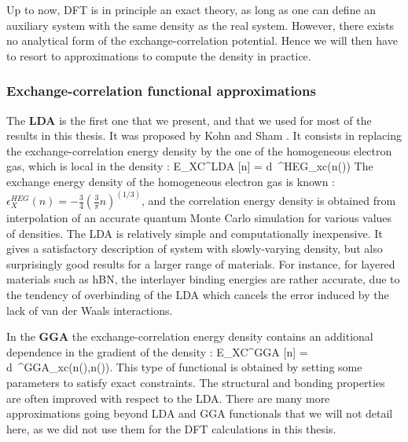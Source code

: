 Up to now, \gls{DFT} is in principle an exact theory, as long as one can define an auxiliary system with the same density as the real system. However, there exists no analytical form of the exchange-correlation potential. Hence we will then have to resort to approximations to compute the density in practice.

\subsubsection{Exchange-correlation functional approximations}
The \textbf{\gls{LDA}} is the first one that we present, and that we used for most of the results in this thesis. It was proposed by Kohn and Sham \cite{kohn1965}. It consists in replacing the exchange-correlation energy density by the one of the homogeneous electron gas, which is local in the density :
\be
	E_{XC}^{LDA} [n] = \int d\rr \ \epsilon^{HEG}_{xc}(n(\rr))
\ee
The exchange energy density of the homogeneous electron gas is known : $\epsilon_X^{HEG}(n) = -\tfrac{3}{4}(\tfrac{3}{\pi}n)^{(1/3)}$, and the correlation energy density is obtained from interpolation of an accurate quantum Monte Carlo simulation \cite{ceperley1980ground} for various values of densities. The LDA is relatively simple and computationally inexpensive. It gives a satisfactory description of system with slowly-varying density, but also surprisingly good results for a larger range of materials. For instance, for layered materials such as hBN, the interlayer binding energies are rather accurate, due to the tendency of overbinding of the LDA which cancels the error induced by the lack of van der Waals interactions.

In the \textbf{\gls{GGA}} the exchange-correlation energy density contains an additional dependence in the gradient of the density :
\be
 	E_{XC}^{GGA} [n] = \int d\rr \ \epsilon^{GGA}_{xc}(n(\rr),\nabla n(\rr)).
\ee
This type of functional is obtained by setting some parameters to satisfy exact constraints. The structural and bonding properties are often improved with respect to the \gls{LDA}.
There are many more approximations going beyond LDA and GGA functionals that we will not detail here, as we did not use them for the DFT calculations in this thesis.
%

